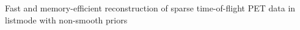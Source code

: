 Fast and memory-efficient reconstruction of sparse time-of-flight PET data in listmode with non-smooth priors
